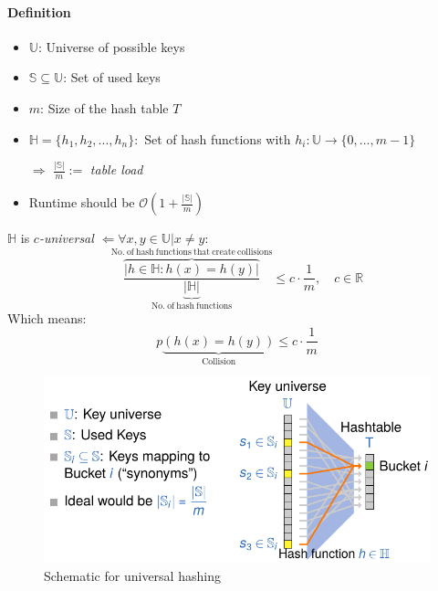 \documentclass[12pt, a4paper]{scrartcl}
\newcommand{\bigO}{\mathcal{O}}
\begin{document}
\paragraph{Definition}
\begin{itemize}
\item $\mathbb{U}$: Universe of possible keys
\item $\mathbb{S}\subseteq\mathbb{U}$: Set of used keys
\item $m$: Size of the hash table $T$
\item $\mathbb{H}=\{h_1,h_2,...,h_n\}:$ Set of hash functions with $h_i:\mathbb{U}\rightarrow\{0,...,m-1\}$
\item[$\Rightarrow$] $\frac{|\mathbb{S}|}{m}:=$ \emph{table load}
\item Runtime should be $\bigO(1+\frac{|\mathbb{S}|}{m})$
\end{itemize}
$\mathbb{H}$ is \emph{$c$-universal} $\Leftarrow \forall x,y\in\mathbb{U}|x\ne y:$
\begin{equation*}
  \overbrace{\frac{|h\in\mathbb{H}:h(x)=h(y)|}{\underbrace{|\mathbb{H}|}_{\mathrm{No.\ of\ hash\ functions}}}}^{\mathrm{No.\ of\ hash\ functions\ that\ create\ collisions}}
  \le c\cdot\frac{1}{m},\quad c\in \mathbb{R}
\end{equation*}
Which means:
\begin{equation*}
  p\underbrace{(h(x)=h(y))}_\mathrm{Collision}\le c\cdot \frac{1}{m}
\end{equation*}
\begin{figure}[!htbp]
  \centering
  \includegraphics[width=.9\textwidth]{universal_hashing}
  \caption{Schematic for universal hashing}
  \label{fig:universal_hashing}
\end{figure}
\end{document}
